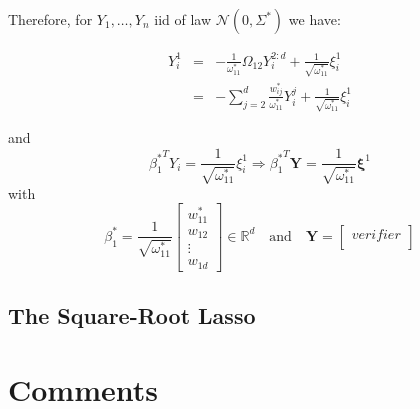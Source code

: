 \documentclass[12pt]{article}
\let\bb\mathbb       %
\def\RR{{\bb R}}\def\ZZ{{\bb Z}}\def\FF{{\bb F}}\def\DD{{\bb D}}
\def\bb{\mathbb}
\def\bY{\boldsymbol Y}
\def\bxi{\boldsymbol \xi}
\begin{document}
Therefore, for $Y_1,\dots,Y_n$ iid of law $\mathcal N(0,\Sigma^*)$ we have:

\begin{equation}
\begin{array}{lcl}
  Y_i^1&=&-\frac{1}{\omega_{11}^*}\Omega_{12}Y_i^{2:d}+\frac{1}{\sqrt{\omega_{11}^*}}\xi^1_i\\
  &=&-\sum_{j=2}^{d}\frac{w_{ij}^*}{\omega_{11}^*}Y_i^j+\frac{1}{\sqrt{\omega_{11}^*}}\xi^1_i
\end{array}
\end{equation}

and
\begin{equation}
{\beta_1^*}^TY_i=\frac{1}{\sqrt{\omega_{11}^*}}\xi^1_i
\Rightarrow
{\beta_1^*}^T\bY=\frac{1}{\sqrt{\omega_{11}^*}}\bxi^1
\end{equation}
with
\begin{equation}
\beta_1^*=\frac{1}{\sqrt{\omega_{11}^*}}
  \begin{bmatrix}
  w_{11}^*\\
  w_{12}\\
  \vdots\\
  w_{1d}
  \end{bmatrix}
  \in \RR^d
  \quad \text{and}\quad \bY= \begin{bmatrix}
  verifier\\
  \end{bmatrix}
\end{equation}


\subsection{The Square-Root Lasso}

\section{Comments}


\end{document}
